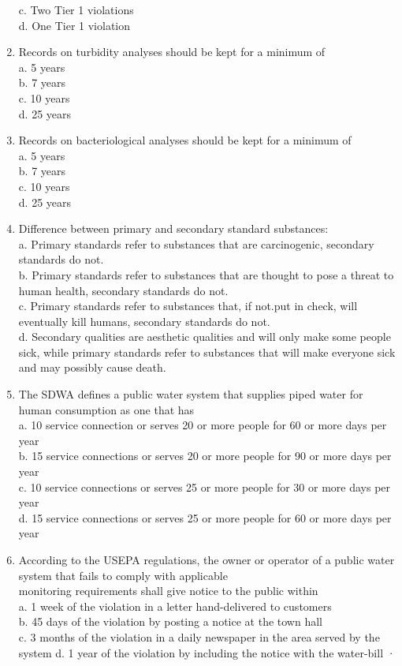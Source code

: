 \begin{enumerate}
c. Two Tier 1 violations\\
d. One Tier 1 violation\\
\item Records on turbidity analyses should be kept for a minimum of\\
a. 5 years\\
b. 7 years\\
c. 10 years\\
d. 25 years\\
\item Records on bacteriological analyses should be kept for a minimum of\\
a. 5 years\\
b. 7 years\\
c. 10 years\\
d. 25 years\\

\item Difference between primary and secondary standard substances:\\
a.	Primary standards refer to substances that are carcinogenic, secondary standards do not.\\
b.	Primary standards refer to substances that are thought to pose a threat to human health, secondary standards do not.\\
c.	Primary standards refer to substances that, if not.put in check, will eventually kill humans, secondary standards do not.\\
d.	Secondary qualities are aesthetic qualities and will only make some people sick, while primary standards refer to substances that will make everyone sick and may possibly cause death.\\

\item The SDWA defines a public water system that supplies piped water for human consumption as one that has\\
a.	10 service connection or serves 20 or more people for 60 or more days per year\\
b.	15 service connections or serves 20 or more people for 90 or more days per year\\
c.	10 service connections or serves 25 or more people for 30 or more days per year\\
d.	15 service connections or serves 25 or more people for 60 or more days per year\\

\item According to the USEPA regulations, the owner or operator of a public water system that fails to comply with applicable\\
monitoring requirements shall give notice to the public within\\
a.	1 week of the violation in a letter hand-delivered to customers\\
b.	45 days of the violation by posting a notice at the town hall\\
c. 	3 months of the violation in a daily newspaper in the area served by the system 
d.  1 year of the violation by including the notice with the water-bill ·\\


\end{enumerate}
